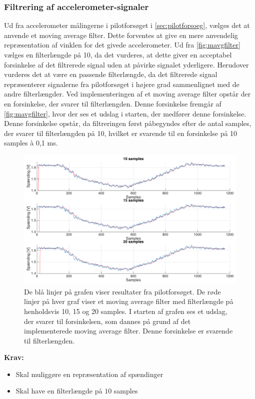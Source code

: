\subsubsection{Filtrering af accelerometer-signaler} \label{sec:mavg_krav}
Ud fra accelerometer målingerne i pilotforsøget i \autoref{sec:pilotforsoeg}, vælges det at anvende et moving average filter. Dette forventes at give en mere anvendelig repræsentation af vinklen for det givede accelerometer. Ud fra \autoref{fig:mavgfilter} vælges en filterlængde på 10, da det vurderes, at dette giver en acceptabel forsinkelse af det filtrerede signal uden at påvirke signalet yderligere. Herudover vurderes det at være en passende filterlængde, da det filtrerede signal repræsenterer signalerne fra pilotforsøget i højere grad sammenlignet med de andre filterlængder. Ved implementeringen af et moving average filter opstår der en forsinkelse, der svarer til filterlængden. Denne forsinkelse fremgår af \autoref{fig:mavgfilter}, hvor der ses et udslag i starten, der medfører denne forsinkelse. Denne forsinkelse opstår, da filtreringen først påbegyndes efter de antal samples, der svarer til filterlængden på 10, hvilket er svarende til en forsinkelse på 10 samples à 0,1 ms. 

\begin{figure} [H]
\centering
\includegraphics[width=1\textwidth]{figures/problemloesning/mavgfilter_matlab} 
\caption{De blå linjer på grafen viser resultater fra pilotforsøget. De røde linjer på hver graf viser et moving average filter med filterlængde på henholdsvis 10, 15 og 20 samples. I starten af grafen ses et udslag, der svarer til forsinkelsen, som dannes på grund af det implementerede moving average filter. Denne forsinkelse er svarende til filterlængden.}
\label{fig:mavgfilter}
\end{figure}

\vspace{3mm}

\textbf{Krav:}
\begin{itemize}
\item Skal muliggøre en repræsentation af spændinger 
\item Skal have en filterlængde på $10$ samples
\end{itemize}